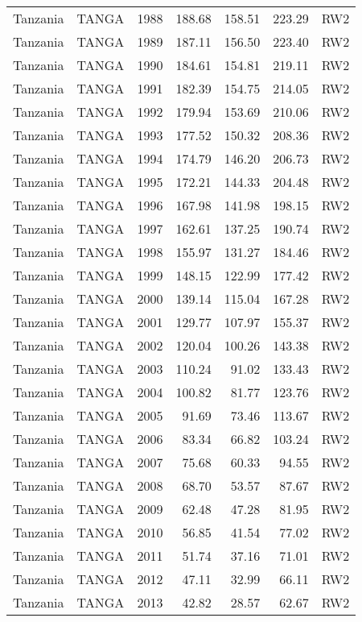\begin{longtable}{lllrrrl}
  Tanzania & TANGA & 1988 & 188.68 & 158.51 & 223.29 & RW2 \\ 
  Tanzania & TANGA & 1989 & 187.11 & 156.50 & 223.40 & RW2 \\ 
  Tanzania & TANGA & 1990 & 184.61 & 154.81 & 219.11 & RW2 \\ 
  Tanzania & TANGA & 1991 & 182.39 & 154.75 & 214.05 & RW2 \\ 
  Tanzania & TANGA & 1992 & 179.94 & 153.69 & 210.06 & RW2 \\ 
  Tanzania & TANGA & 1993 & 177.52 & 150.32 & 208.36 & RW2 \\ 
  Tanzania & TANGA & 1994 & 174.79 & 146.20 & 206.73 & RW2 \\ 
  Tanzania & TANGA & 1995 & 172.21 & 144.33 & 204.48 & RW2 \\ 
  Tanzania & TANGA & 1996 & 167.98 & 141.98 & 198.15 & RW2 \\ 
  Tanzania & TANGA & 1997 & 162.61 & 137.25 & 190.74 & RW2 \\ 
  Tanzania & TANGA & 1998 & 155.97 & 131.27 & 184.46 & RW2 \\ 
  Tanzania & TANGA & 1999 & 148.15 & 122.99 & 177.42 & RW2 \\ 
  Tanzania & TANGA & 2000 & 139.14 & 115.04 & 167.28 & RW2 \\ 
  Tanzania & TANGA & 2001 & 129.77 & 107.97 & 155.37 & RW2 \\ 
  Tanzania & TANGA & 2002 & 120.04 & 100.26 & 143.38 & RW2 \\ 
  Tanzania & TANGA & 2003 & 110.24 & 91.02 & 133.43 & RW2 \\ 
  Tanzania & TANGA & 2004 & 100.82 & 81.77 & 123.76 & RW2 \\ 
  Tanzania & TANGA & 2005 & 91.69 & 73.46 & 113.67 & RW2 \\ 
  Tanzania & TANGA & 2006 & 83.34 & 66.82 & 103.24 & RW2 \\ 
  Tanzania & TANGA & 2007 & 75.68 & 60.33 & 94.55 & RW2 \\ 
  Tanzania & TANGA & 2008 & 68.70 & 53.57 & 87.67 & RW2 \\ 
  Tanzania & TANGA & 2009 & 62.48 & 47.28 & 81.95 & RW2 \\ 
  Tanzania & TANGA & 2010 & 56.85 & 41.54 & 77.02 & RW2 \\ 
  Tanzania & TANGA & 2011 & 51.74 & 37.16 & 71.01 & RW2 \\ 
  Tanzania & TANGA & 2012 & 47.11 & 32.99 & 66.11 & RW2 \\ 
  Tanzania & TANGA & 2013 & 42.82 & 28.57 & 62.67 & RW2 \\ 

\end{longtable}
